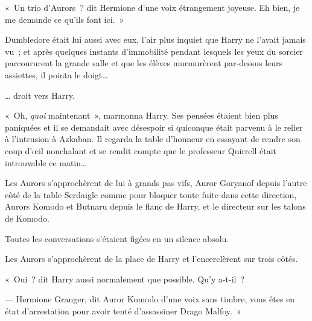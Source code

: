 «~Un trio d'Aurors~? dit Hermione d'une voix étrangement joyeuse.
Eh bien, je me demande ce qu'ils font ici.~»

Dumbledore était lui aussi avec eux, l'air plus inquiet que Harry ne l'avait jamais vu~; et après quelques instants d'immobilité pendant lesquels les yeux du sorcier parcoururent la grande salle et que les élèves murmurèrent par-dessus leurs assiettes, il pointa le doigt…

… droit vers Harry.

«~Oh, \emph{quoi} maintenant~», marmonna Harry.
Ses pensées étaient bien plus paniquées et il se demandait avec désespoir si quiconque était parvenu à le relier à l'intrusion à Azkaban.
Il regarda la table d'honneur en essayant de rendre son coup d'œil nonchalant et se rendit compte que le professeur Quirrell était introuvable ce matin…

Les Aurors s'approchèrent de lui à grands pas vifs, Auror Goryanof depuis l'autre côté de la table Serdaigle comme pour bloquer toute fuite dans cette direction, Aurors Komodo et Butnaru depuis le flanc de Harry, et le directeur sur les talons de Komodo.

Toutes les conversations s'étaient figées en un silence absolu.

Les Aurors s'approchèrent de la place de Harry et l'encerclèrent sur trois côtés.

«~Oui~? dit Harry aussi normalement que possible.
Qu'y a-t-il~?

--- Hermione Granger, dit Auror Komodo d'une voix sans timbre, vous êtes en état d'arrestation pour avoir tenté d'assassiner Drago Malfoy.~»
